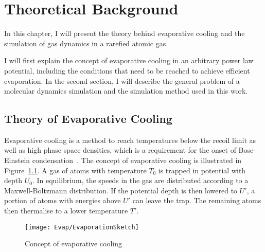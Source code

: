 

\chapter{Theoretical Background}
\label{cha:eva_theory}
In this chapter, I will present the theory behind evaporative cooling and the simulation of gas dynamics in a rarefied atomic gas.

I will first explain the concept of evaporative cooling in an arbitrary power law potential, including the conditions that need to be reached to achieve efficient evaporation. In the second section, I will describe the general problem of a molecular dynamics simulation and the simulation method used in this work.

\section{Theory of Evaporative Cooling}
\label{sec:evaporative_cooling_theory}
Evaporative cooling is a method to reach temperatures below the recoil limit as well as high phase space densities, which is a requirement for the onset of Bose-Einstein condensation~\cite{pethick_smith_2008}. The concept of evaporative cooling is illustrated in Figure~\ref{fig:evaporative_cooling_sketch}. A gas of atoms with temperature $T_0$ is trapped in potential with depth $U_0$. In equilibrium, the speeds in the gas are distributed according to a Maxwell-Boltzmann distribution. If the potential depth is then lowered to $U'$, a portion of atoms with energies above $U'$ can leave the trap. The remaining atoms then thermalise to a lower temperature $T'$. 
\begin{figure}[htbp]
    \centering
    \texttt{[image: Evap/EvaporationSketch]}
    \caption{Concept of evaporative cooling}
    \label{fig:evaporative_cooling_sketch}
\end{figure}


